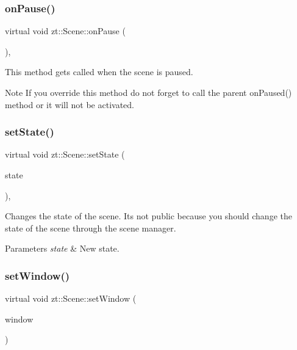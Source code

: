 \subsubsection{\texorpdfstring{on\+Pause()}{onPause()}}
{\footnotesize\ttfamily virtual void zt\+::\+Scene\+::on\+Pause (\begin{DoxyParamCaption}{ }\end{DoxyParamCaption})\hspace{0.3cm}{\ttfamily [protected]}, {\ttfamily [virtual]}}



This method gets called when the scene is paused. 

\begin{DoxyNote}{Note}
If you override this method do not forget to call the parent on\+Paused() method or it will not be activated. 
\end{DoxyNote}
\mbox{\label{classzt_1_1_scene_a0a0d32e948aca8f581a771f54a4444e5}} 
\subsubsection{\texorpdfstring{set\+State()}{setState()}}
{\footnotesize\ttfamily virtual void zt\+::\+Scene\+::set\+State (\begin{DoxyParamCaption}\item[{\hyperlink{classzt_1_1_scene_a5618d9448cd874af20a6be8ed60c87a5}{State}}]{state }\end{DoxyParamCaption})\hspace{0.3cm}{\ttfamily [protected]}, {\ttfamily [virtual]}}



Changes the state of the scene. It\textquotesingle{}s not public because you should change the state of the scene through the scene manager. 


\begin{DoxyParams}{Parameters}
{\em state} & New state. \\
\hline
\end{DoxyParams}
\mbox{\label{classzt_1_1_scene_ac7b62a9ada72130fd1d131c080e9a339}} 
\subsubsection{\texorpdfstring{set\+Window()}{setWindow()}}
{\footnotesize\ttfamily virtual void zt\+::\+Scene\+::set\+Window (\begin{DoxyParamCaption}\item[{sf\+::\+Render\+Window \&}]{window }\end{DoxyParamCaption})\hspace{0.3cm}{\ttfamily [virtual]}}



